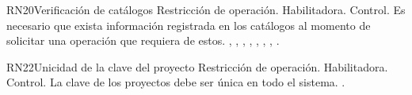 
\begin{BussinesRule}{RN20}{Verificación de catálogos} 
	\BRitem[Tipo:] Restricción de operación. 
	\BRitem[Clase:] Habilitadora. 
	\BRitem[Nivel:] Control. %
	\BRitem[Descripción:] Es necesario que exista información registrada en los catálogos al momento de solicitar una operación que requiera de estos.
	 , , , , , , , . 
\end{BussinesRule}



\begin{BussinesRule}{RN22}{Unicidad de la clave del proyecto} 
	\BRitem[Tipo:] Restricción de operación. 
	\BRitem[Clase:] Habilitadora. 
	\BRitem[Nivel:] Control. %
	\BRitem[Descripción:] La clave de los proyectos debe ser única en todo el sistema.
	 . 
\end{BussinesRule}

